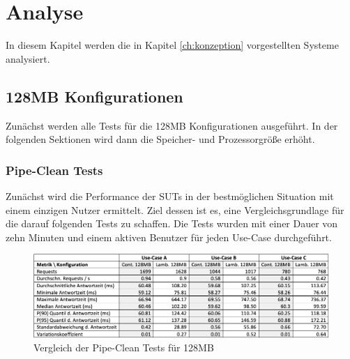 \chapter{Analyse}
In diesem Kapitel werden die in Kapitel \ref{ch:konzeption} vorgestellten Systeme analysiert.

\section{128MB Konfigurationen}
Zunächst werden alle Tests für die 128MB Konfigurationen ausgeführt. In der folgenden Sektionen wird dann die Speicher- und Prozessorgröße erhöht. 

\subsection{Pipe-Clean Tests}
Zunächst wird die Performance der \acp{SUT} in der bestmöglichen Situation mit einem einzigen Nutzer ermittelt. Ziel dessen ist es, eine Vergleichsgrundlage für die darauf folgenden Tests zu schaffen. Die Tests wurden mit einer Dauer von zehn Minuten und einem aktiven Benutzer für jeden Use-Case durchgeführt.

\begin{figure}[H]
    \includegraphics[width=\textwidth]{img/pipe128-comparison.png}
    \caption[Vergleich der Pipe-Clean Tests für 128MB]{Vergleich der Pipe-Clean Tests für 128MB}
    \label{fig:pipe128-comparison}
\end{figure}

